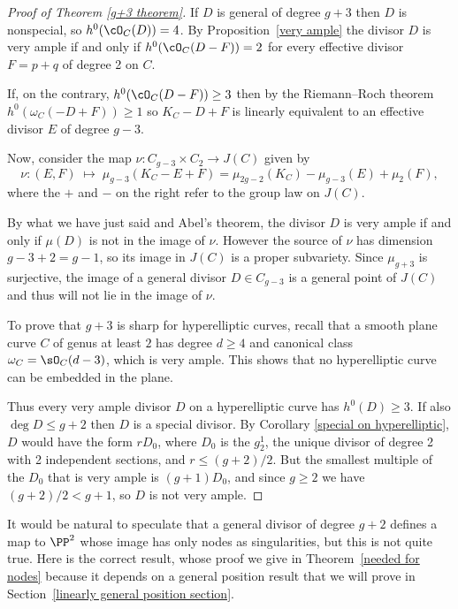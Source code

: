\begin{proof}[Proof of Theorem \ref{g+3 theorem}]
If
$D$ is general of degree $g+3$ then $D$ is nonspecial,
so $h^0(\cO_C(D)) = 4$. By Proposition~\ref{very ample} the divisor
$D$ is very ample if and only if $h^0(\cO_C(D-F)) = 2$
for every effective divisor $F = p+q$ of degree 2 on $C$.

If, on the contrary, $h^0(\cO_C(D-F)) \geq 3$ then by the
Riemann--Roch theorem
%
$h^0(\omega_C(-D + F)) \geq 1$
so $K_C - D + F$ is  linearly equivalent to
an effective divisor $E$ of degree $g-3$.

Now, consider the map
$\nu : C_{g-3} \times C_{2}  \to  J(C)$
given by
$$
\nu : (E,F) \; \mapsto \; \mu_{g-3}(K_C - E + F) = \mu_{2g-2}(K_C) - \mu_{g-3}(E) + \mu_{2}(F),
$$
where the $+$ and $-$ on the right refer to the group law on $J(C)$.

By what we have just said and
Abel's theorem,
%
the divisor $D$ is very ample if and only if
$\mu(D)$
is not in the image of $\nu$.
However the source of $\nu$ has dimension $g-3+2 = g-1$, so its image
in $J(C)$ is a proper subvariety. Since $\mu_{g+3}$ is surjective, the
image of a general divisor $D \in C_{g-3}$ is a general point of
$J(C)$ and thus will not lie in the image of $\nu$.

To prove that $g+3$ is sharp for hyperelliptic curves, recall that a
%
smooth plane curve $C$ of genus
at least $2$
has degree $d\geq 4$ and canonical class
$\omega_{C} = \sO_{C}(d-\nobreak 3)$, which is very ample.
This shows that
no hyperelliptic curve  can
be embedded in the plane.

Thus every very ample divisor $D$ on a hyperelliptic curve  has $h^0(D) \geq 3$. If also $\deg D \leq g+2$
then $D$ is a special divisor. By Corollary \ref{special on hyperelliptic}, $D$ would have the form
$rD_0$, where $D_0$ is the $g^1_2$, the unique divisor of degree 2 with 2 independent sections,
and $r \leq (g+2)/2$. But the smallest multiple of the $D_0$ that is very ample is $(g+1)D_0$, and
since $g\geq 2$ we have $(g+2)/2 < g+1$, so $D$ is not very ample.
\unif
\end{proof}

It would be natural to speculate that a general divisor of degree $g+2$ defines a map to $\PP^2$ whose
image has only nodes as singularities, but this is not quite true. Here is the correct result,
whose proof we give in
Theorem~\ref{needed for nodes}
because it depends on a general position result that
we will prove in Section~\ref{linearly general position section}.

